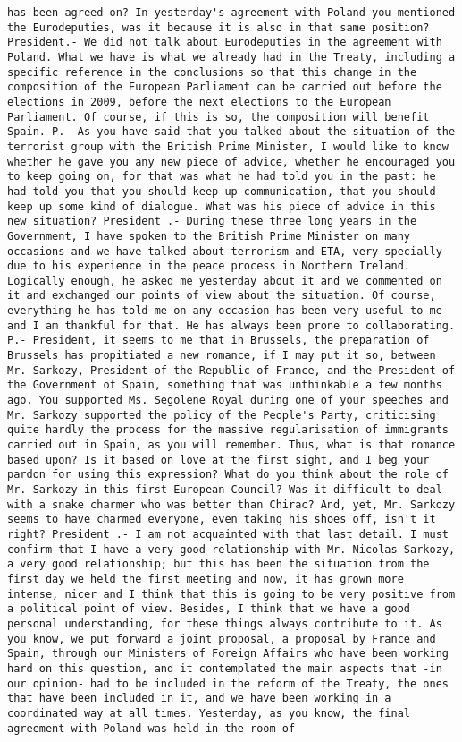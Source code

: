 \documentclass[
]{article}
\begin{document}
\begin{verbatim}
has been agreed on? In yesterday's agreement with Poland you mentioned the Eurodeputies, was it because it is also in that same position? President.- We did not talk about Eurodeputies in the agreement with Poland. What we have is what we already had in the Treaty, including a specific reference in the conclusions so that this change in the composition of the European Parliament can be carried out before the elections in 2009, before the next elections to the European Parliament. Of course, if this is so, the composition will benefit Spain. P.- As you have said that you talked about the situation of the terrorist group with the British Prime Minister, I would like to know whether he gave you any new piece of advice, whether he encouraged you to keep going on, for that was what he had told you in the past: he had told you that you should keep up communication, that you should keep up some kind of dialogue. What was his piece of advice in this new situation? President .- During these three long years in the Government, I have spoken to the British Prime Minister on many occasions and we have talked about terrorism and ETA, very specially due to his experience in the peace process in Northern Ireland. Logically enough, he asked me yesterday about it and we commented on it and exchanged our points of view about the situation. Of course, everything he has told me on any occasion has been very useful to me and I am thankful for that. He has always been prone to collaborating. P.- President, it seems to me that in Brussels, the preparation of Brussels has propitiated a new romance, if I may put it so, between Mr. Sarkozy, President of the Republic of France, and the President of the Government of Spain, something that was unthinkable a few months ago. You supported Ms. Segolene Royal during one of your speeches and Mr. Sarkozy supported the policy of the People's Party, criticising quite hardly the process for the massive regularisation of immigrants carried out in Spain, as you will remember. Thus, what is that romance based upon? Is it based on love at the first sight, and I beg your pardon for using this expression? What do you think about the role of Mr. Sarkozy in this first European Council? Was it difficult to deal with a snake charmer who was better than Chirac? And, yet, Mr. Sarkozy seems to have charmed everyone, even taking his shoes off, isn't it right? President .- I am not acquainted with that last detail. I must confirm that I have a very good relationship with Mr. Nicolas Sarkozy, a very good relationship; but this has been the situation from the first day we held the first meeting and now, it has grown more intense, nicer and I think that this is going to be very positive from a political point of view. Besides, I think that we have a good personal understanding, for these things always contribute to it. As you know, we put forward a joint proposal, a proposal by France and Spain, through our Ministers of Foreign Affairs who have been working hard on this question, and it contemplated the main aspects that -in our opinion- had to be included in the reform of the Treaty, the ones that have been included in it, and we have been working in a coordinated way at all times. Yesterday, as you know, the final agreement with Poland was held in the room of 
\end{verbatim}
\end{document}
